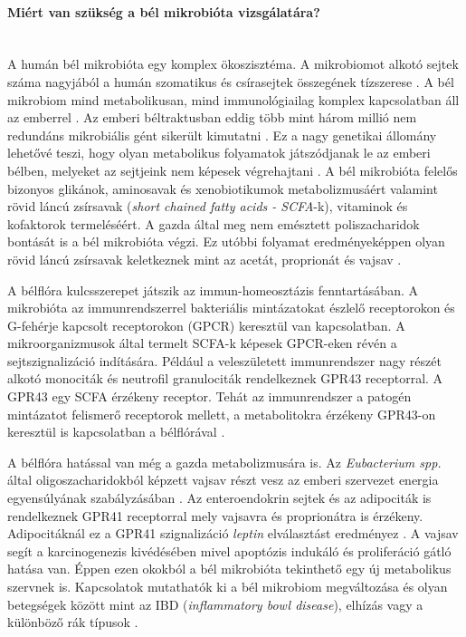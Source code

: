 \documentclass[a4paper,12pt]{article}
\begin{document}
		\paragraph{Miért van szükség a bél mikrobióta vizsgálatára?} \mbox{}\\
		A humán bél mikrobióta egy komplex ökoszisztéma. A mikrobiomot alkotó sejtek száma nagyjából a humán szomatikus és csírasejtek összegének tízszerese \cite{scfa_and_vitamine}.  A bél mikrobiom mind metabolikusan, mind immunológiailag komplex kapcsolatban áll az emberrel \cite{gut_microbiome}. Az emberi béltraktusban eddig több mint három millió nem redundáns mikrobiális gént sikerült kimutatni \cite{meta_omics}. Ez a nagy genetikai állomány lehetővé teszi, hogy olyan metabolikus folyamatok játszódjanak le az emberi bélben, melyeket az sejtjeink nem képesek végrehajtani \cite{gut_microbiome}. A bél mikrobióta felelős bizonyos glikánok, aminosavak és xenobiotikumok metabolizmusáért valamint rövid láncú zsírsavak (\textit{short chained fatty acids - SCFA}-k), vitaminok és kofaktorok termeléséért. A gazda által meg nem emésztett poliszacharidok bontását is a bél mikrobióta végzi. Ez utóbbi folyamat eredményeképpen olyan rövid láncú zsírsavak keletkeznek mint az acetát, proprionát és vajsav \cite{scfa_and_vitamine}.
		
		A bélflóra kulcsszerepet játszik az immun-homeosztázis fenntartásában. A mikrobióta az immunrendszerrel bakteriális mintázatokat észlelő receptorokon és G-fehérje kapcsolt receptorokon (GPCR) keresztül van kapcsolatban. A mikroorganizmusok által termelt SCFA-k képesek GPCR-eken révén a sejtszignalizáció indítására. Például a veleszületett immunrendszer nagy részét alkotó monociták és neutrofil granulociták rendelkeznek GPR43 receptorral. A GPR43 egy SCFA érzékeny receptor. Tehát az immunrendszer a patogén mintázatot felismerő receptorok mellett, a metabolitokra érzékeny GPR43-on keresztül is kapcsolatban a bélflórával \cite{buthyrate_immune}.
		
		A bélflóra hatással van még a gazda metabolizmusára is.  Az \textit{Eubacterium spp.} által oligoszacharidokból képzett vajsav részt vesz az emberi szervezet energia egyensúlyának szabályzásában \cite{gut_microbiome}. Az enteroendokrin sejtek és az adipociták is rendelkeznek GPR41 receptorral mely vajsavra és proprionátra is érzékeny. Adipocitáknál ez a GPR41 szignalizáció \textit{leptin} elválasztást eredményez \cite{buthyrate_immune}. A vajsav segít a karcinogenezis kivédésében mivel apoptózis indukáló és proliferáció gátló hatása van. Éppen ezen okokból a bél mikrobióta tekinthető egy új metabolikus szervnek is\cite{scfa_and_vitamine}. Kapcsolatok mutathatók ki a bél mikrobiom megváltozása és olyan betegségek között mint az IBD (\textit{inflammatory bowl disease}), elhízás vagy a különböző rák típusok \cite{gut_microbiome}.
		
\end{document}
